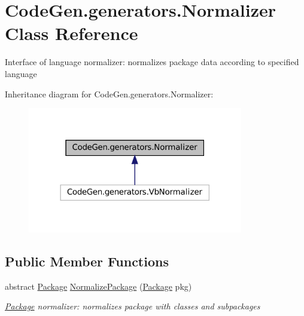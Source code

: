 \hypertarget{classCodeGen_1_1generators_1_1Normalizer}{}\section{Code\+Gen.\+generators.\+Normalizer Class Reference}
\label{classCodeGen_1_1generators_1_1Normalizer}


Interface of language normalizer\+: normalizes package data according to specified language  




Inheritance diagram for Code\+Gen.\+generators.\+Normalizer\+:
\nopagebreak
\begin{figure}[H]
\begin{center}
\leavevmode
\includegraphics[width=266pt]{classCodeGen_1_1generators_1_1Normalizer__inherit__graph}
\end{center}
\end{figure}
\subsection*{Public Member Functions}
\begin{DoxyCompactItemize}
\item 
abstract \mbox{\hyperlink{classCodeGen_1_1generators_1_1Package}{Package}} \mbox{\hyperlink{classCodeGen_1_1generators_1_1Normalizer_a24212f04a2ed558c46ac62e23efcf0ae}{Normalize\+Package}} (\mbox{\hyperlink{classCodeGen_1_1generators_1_1Package}{Package}} pkg)
\begin{DoxyCompactList}\small\item\em \mbox{\hyperlink{classCodeGen_1_1generators_1_1Package}{Package}} normalizer\+: normalizes package with classes and subpackages \end{DoxyCompactList}\end{DoxyCompactItemize}
